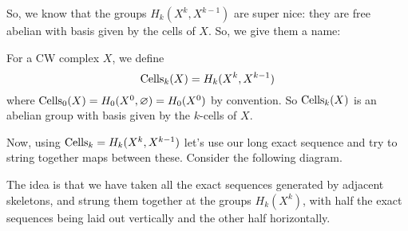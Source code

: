 So, we know that the groups $H_k(X^k, X^{k-1})$ are super nice:
they are free abelian with basis given by the cells of $X$.
So, we give them a name:
\begin{definition}
	For a CW complex $X$, we define
	\[ \operatorname{Cells}_k(X) = H_k(X^k, X^{k-1}) \]
	where $\operatorname{Cells}_0(X) = H_0(X^0, \varnothing) = H_0(X^0)$ by convention.
	So $\operatorname{Cells}_k(X)$ is an abelian group with basis given by
	the $k$-cells of $X$.
\end{definition}

Now, using $\operatorname{Cells}_k = H_k(X^k, X^{k-1})$ let's use
our long exact sequence and try to string together maps between these.
Consider the following diagram.

\begin{center}
\newcommand{\CX}[1]{\boxed{\color{blue}\Cells_{#1}(X)}}
\end{center}

The idea is that we have taken all the exact sequences generated by adjacent
skeletons, and strung them together at the groups $H_k(X^k)$,
with half the exact sequences being laid out vertically
and the other half horizontally.

